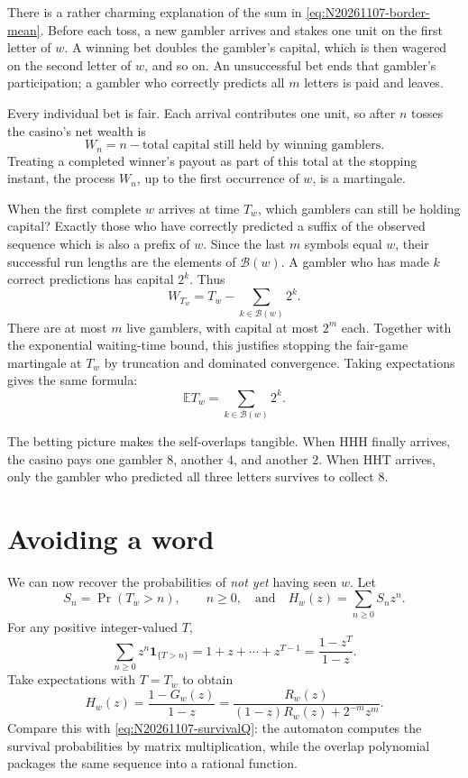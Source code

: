 There is a rather charming explanation of the sum in \eqref{eq:N20261107-border-mean}. Before each toss, a new gambler arrives and stakes one unit on the first letter of \(w\). A winning bet doubles the gambler's capital, which is then wagered on the second letter of \(w\), and so on. An unsuccessful bet ends that gambler's participation; a gambler who correctly predicts all \(m\) letters is paid and leaves.

Every individual bet is fair. Each arrival contributes one unit, so after \(n\) tosses the casino's net wealth is
\[
 W_n=n-\text{total capital still held by winning gamblers}.
\]
Treating a completed winner's payout as part of this total at the stopping instant, the process \(W_n\), up to the first occurrence of \(w\), is a martingale.

When the first complete \(w\) arrives at time \(T_w\), which gamblers can still be holding capital? Exactly those who have correctly predicted a suffix of the observed sequence which is also a prefix of \(w\). Since the last \(m\) symbols equal \(w\), their successful run lengths are the elements of \(\mathcal B(w)\). A gambler who has made \(k\) correct predictions has capital \(2^k\). Thus
\[
 W_{T_w}=T_w-\sum_{k\in\mathcal B(w)}2^k.
\]
There are at most \(m\) live gamblers, with capital at most \(2^m\) each. Together with the exponential waiting-time bound, this justifies stopping the fair-game martingale at \(T_w\) by truncation and dominated convergence. Taking expectations gives the same formula:
\[
 \mathbb E T_w=\sum_{k\in\mathcal B(w)}2^k.
\]

The betting picture makes the self-overlaps tangible. When \(\mathrm{HHH}\) finally arrives, the casino pays one gambler \(8\), another \(4\), and another \(2\). When \(\mathrm{HHT}\) arrives, only the gambler who predicted all three letters survives to collect \(8\).

\section{Avoiding a word}

We can now recover the probabilities of \emph{not yet} having seen \(w\). Let
\[
 S_n=\Pr(T_w>n),\qquad n\geq0,
 \quad\text{and}\quad
 H_w(z)=\sum_{n\geq0}S_nz^n.
\]
For any positive integer-valued \(T\),
\[
 \sum_{n\geq0}z^n\mathbf1_{\{T>n\}}
 =1+z+\cdots+z^{T-1}=\frac{1-z^T}{1-z}.
\]
Take expectations with \(T=T_w\) to obtain
\begin{equation}
 H_w(z)=\frac{1-G_w(z)}{1-z}
       =\frac{R_w(z)}
        {(1-z)R_w(z)+2^{-m}z^m}.
 \label{eq:N20261107-survival-generating}
\end{equation}
Compare this with \eqref{eq:N20261107-survivalQ}: the automaton computes the survival probabilities by matrix multiplication, while the overlap polynomial packages the same sequence into a rational function.


